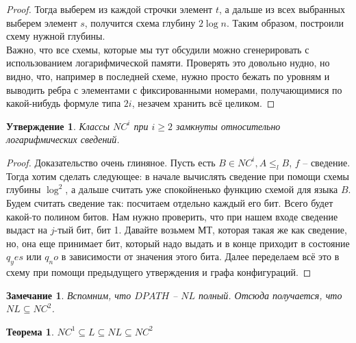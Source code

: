 \documentclass[12pt, letterpaper]{article}
\newtheorem{theorem}{Теорема}[section]
\newtheorem{prop}{Утверждение}[section]
\newtheorem{note}{Замечание}[section]
\newcommand{\leql}{\leq_{l}}
\begin{document}
\begin{proof}
Тогда выберем из каждой строчки элемент $t$, а дальше из всех выбранных выберем элемент $s$, получится схема глубину $2\log n$. Таким образом, построили схему нужной глубины.\\
Важно, что все схемы, которые мы тут обсудили можно сгенерировать с использованием логарифмической памяти. Проверять это довольно нудно, но видно, что, например в последней схеме, нужно просто бежать по уровням и выводить ребра с элементами с фиксированными номерами, получающимися по какой-нибудь формуле типа $2i$, незачем хранить всё целиком.
\end{proof}
\begin{prop}
Классы $NC^i$ при $i \geq 2$ замкнуты относительно логарифмических сведений. 
\end{prop}
\begin{proof}
Доказательство очень глиняное. Пусть есть $B \in NC^i, A \leql B$, $f$ -- сведение. Тогда хотим сделать следующее: в начале вычислять сведение при помощи схемы глубины $\log^2$, а дальше считать уже спокойненько функцию схемой для языка $B$. Будем считать сведение так: посчитаем отдельно каждый его бит. Всего будет какой-то полином битов. Нам нужно проверить, что при нашем входе сведение выдаст на $j$-тый бит, бит 1. Давайте возьмем МТ, которая такая же как сведение, но, она еще принимает бит, который надо выдать и в конце приходит в состояние $q_yes$ или $q_no$ в зависимости от значения этого бита. Далее переделаем всё это в схему при помощи предыдущего утверждения и графа конфигураций.  
\end{proof}
\begin{note}
Вспомним, что $DPATH$ -- $NL$ полный. Отсюда получается, что $NL \subseteq NC^2$.
\end{note}
\begin{theorem}
$NC^1 \subseteq L \subseteq NL \subseteq NC^2$
\end{theorem}
\end{document}
